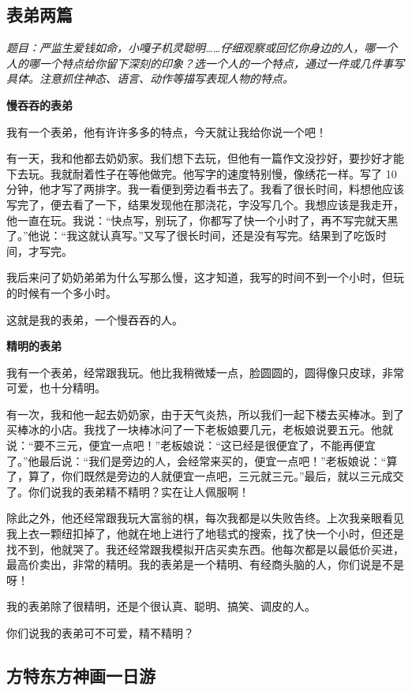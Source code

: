 \documentclass[UTF8,a4paper,titlepage,twoside,10.5pt]{article}
\begin{document}
\subsection{表弟两篇}
\label{sec:orgdd2d94d}

\emph{题目：严监生爱钱如命，小嘎子机灵聪明……仔细观察或回忆你身边的人，哪一个人的哪一个特点给你留下深刻的印象？选一个人的一个特点，通过一件或几件事写具体。注意抓住神态、语言、动作等描写表现人物的特点。}

\textbf{慢吞吞的表弟}

我有一个表弟，他有许许多多的特点，今天就让我给你说一个吧！

有一天，我和他都去奶奶家。我们想下去玩，但他有一篇作文没抄好，要抄好才能下去玩。我就耐着性子在等他做完。他写字的速度特别慢，像绣花一样。写了 10 分钟，他才写了两排字。我一看便到旁边看书去了。我看了很长时间，料想他应该写完了，便去看了一下，结果发现他在那浇花，字没写几个。我想应该是我走开，他一直在玩。我说：“快点写，别玩了，你都写了快一个小时了，再不写完就天黑了。”他说：“我这就认真写。”又写了很长时间，还是没有写完。结果到了吃饭时间，才写完。

我后来问了奶奶弟弟为什么写那么慢，这才知道，我写的时间不到一个小时，但玩的时候有一个多小时。

这就是我的表弟，一个慢吞吞的人。

\vspace*{\baselineskip}

\textbf{精明的表弟}

我有一个表弟，经常跟我玩。他比我稍微矮一点，脸圆圆的，圆得像只皮球，非常可爱，也十分精明。

有一次，我和他一起去奶奶家，由于天气炎热，所以我们一起下楼去买棒冰。到了买棒冰的小店。我找了一块棒冰问了一下老板娘要几元，老板娘说要五元。他就说：“要不三元，便宜一点吧！”老板娘说：“这已经是很便宜了，不能再便宜了。”他最后说：“我们是旁边的人，会经常来买的，便宜一点吧！”老板娘说：“算了，算了，你们既然是旁边的人就便宜一点吧，三元就三元。”最后，就以三元成交了。你们说我的表弟精不精明？实在让人佩服啊！

除此之外，他还经常跟我玩大富翁的棋，每次我都是以失败告终。上次我亲眼看见我上衣一颗纽扣掉了，他就在地上进行了地毯式的搜索，找了快一个小时，但还是找不到，他就哭了。我还经常跟我模拟开店买卖东西。他每次都是以最低价买进，最高价卖出，非常的精明。我的表弟是一个精明、有经商头脑的人，你们说是不是呀！

我的表弟除了很精明，还是个很认真、聪明、搞笑、调皮的人。

你们说我的表弟可不可爱，精不精明？

\subsection{方特东方神画一日游}
\label{sec:orgf9353a6}
\end{document}
